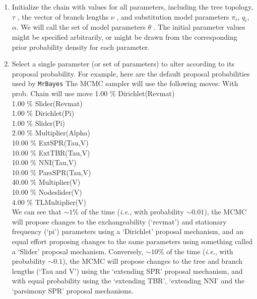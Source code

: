 \documentclass[11pt]{article}
\begin{document}
\begin{enumerate}
\item{Initialize the chain with values for all parameters, including the tree topology, $\tau$ , the vector of branch lengths $\nu$ , and substitution model parameters $\pi_i$, $q_i$, $\alpha$. We will call the set of model parameters $\theta$ . The initial parameter values might be specified arbitrarily, or might be drawn from the corresponding prior probability density for each parameter.}

\item{Select a single parameter (or set of parameters) to alter according to its proposal probability. For example, here are the default proposal probabilities used by \verb!MrBayes!\:
      The MCMC sampler will use the following moves:
         With prob.  Chain will use move
            1.00 \%   Dirichlet(Revmat)\\
            1.00 \%   Slider(Revmat)\\
            1.00 \%   Dirichlet(Pi)\\
            1.00 \%   Slider(Pi)\\
            2.00 \%   Multiplier(Alpha)\\
           10.00 \%   ExtSPR(Tau,V)\\
           10.00 \%   ExtTBR(Tau,V)\\
           10.00 \%   NNI(Tau,V)\\
           10.00 \%   ParsSPR(Tau,V)\\
           40.00 \%   Multiplier(V)\\
           10.00 \%   Nodeslider(V)\\
            4.00 \%   TLMultiplier(V)\\

We can see that $\sim 1\%$ of the time ({\it i.e.}, with probability $\sim 0.01$), the MCMC will propose changes to the exchangeability (`revmat’) and stationary frequency (`pi’) parameters using a `Dirichlet' proposal mechanism, and an equal effort proposing changes to the same parameters using something called a `Slider’ proposal mechanism. Conversely, $\sim 10\%$ of the time ({\it i.e.}, with probability $\sim 0.1$), the MCMC will propose changes to the tree and branch lengths (`Tau and V’) using the `extending SPR’ proposal mechanism, and with equal probability using the `extending TBR’, `extending NNI’ and the `parsimony SPR’ proposal mechanisms.

}
\end{enumerate}
\end{document}
